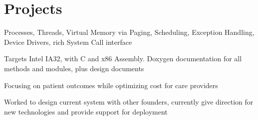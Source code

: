 \documentclass[letterpaper]{deedy-resume}
\begin{document}
\begin{minipage}[t]{0.66\textwidth}
    \sectionspace

    \section{Projects}

        \begin{tightitemize}
          \item Processes, Threads, Virtual Memory via Paging, Scheduling,
            Exception Handling, Device Drivers, rich System Call interface
          \item Targets Intel IA32, with C and x86 Assembly. Doxygen
            documentation for all methods and modules, plus design documents
        \end{tightitemize}


        \begin{tightitemize}
          \item Focusing on patient outcomes while optimizing cost for care
            providers
          \item Worked to design current system with other founders, currently
            give direction for new technologies and provide support for
            deployment
        \end{tightitemize}

  \end{minipage} %
\end{document}

